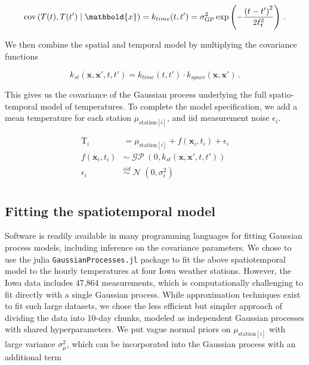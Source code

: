\documentclass[letter]{article}
\newcommand{\genericdel}[3]{%
      \left#1#3\right#2
    }
\newcommand{\del}[1]{\genericdel(){#1}}
\newcommand{\sbr}[1]{\genericdel[]{#1}}
\DeclareMathOperator{\cov}{{cov}}
\DeclareMathOperator{\normal}{\mathcal{N}}
\DeclareMathOperator{\GP}{\mathcal{GP}}
\newcommand{\T}{\mathrm{T}}
\newcommand{\station}[1]{\mathrm{station}\sbr{#1}}
\newcommand{\xvec}{\mathbold{x}}
\newcommand{\iid}{iid}
\newcommand{\sigmaf}{\sigma_{\mathrm{GP}}}
\newcommand{\sigman}{\sigma_{\epsilon}}
\newcommand{\eqlabel}[1]{\label{#1}}
\begin{document}
\begin{equation}
\cov\del{T(t), T(t') \mid \xvec} = k_{time}(t, t') = \sigmaf^2 \exp\del{-\frac{\del{t-t'}^2}{2\ell_t^2}}\,.
\end{equation}

We then combine the spatial and temporal model by multiplying the covariance functions

\begin{equation}
k_{st}(\xvec,\xvec',t,t') = k_{time}(t,t') \cdot k_{space}(\xvec, \xvec')\,.
\end{equation}

This gives us the covariance of the Gaussian process underlying the full spatio-temporal model of temperatures.
To complete the model specification, we add a mean temperature for each station \(\mu_{\station{i}}\), and iid measurement noise \(\epsilon_i\).

\begin{equation}
\begin{split}
    \T_i &= \mu_{\station{i}} + f(\xvec_i, t_i) + \epsilon_i\\
    f(\xvec_i, t_i) &\sim \GP\del{0, k_{st}(\xvec,\xvec',t,t')}\\
    \epsilon_i &\overset{\iid}{\sim} \normal\del{0,\sigman^2}\\
\end{split}
\eqlabel{eq:gpmodel}
\end{equation}
    


        \subsection{Fitting the spatiotemporal model}\label{fitting-the-spatiotemporal-model}

Software is readily available in many programming languages for fitting Gaussian process models, including inference on the covariance parameters. We chose to use the julia \texttt{GaussianProcesses.jl} package to fit the above spatiotemporal model to the hourly temperatures at four Iowa weather stations. However, the Iowa data includes 47,864 measurements, which is computationally challenging to fit directly with a single Gaussian process.
While approximation techniques exist to fit such large datasets, we chose the less efficient but simpler approach of dividing the data into 10-day chunks, modeled as independent Gaussian processes with shared hyperparameters.
We put vague normal priors on \(\mu_{\station{i}}\) with large variance \(\sigma_{\mu}^2\), which can be incorporated into the Gaussian process with an additional term
\end{document}
